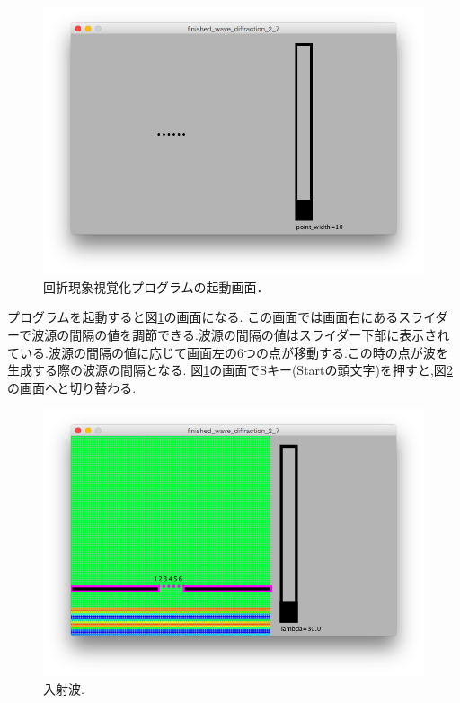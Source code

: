 \begin{figure}[htbp]
 \begin{center}
  \includegraphics[width=\linewidth]{../result/diffractionstart.png}
 \end{center}
 \caption{回折現象視覚化プログラムの起動画面．}
 \label{fig:start}
\end{figure}



プログラムを起動すると図\ref{fig:start}の画面になる.
この画面では画面右にあるスライダーで波源の間隔の値を調節できる.波源の間隔の値はスライダー下部に表示されている.波源の間隔の値に応じて画面左の6つの点が移動する.この時の点が波を生成する際の波源の間隔となる.
図\ref{fig:start}の画面でSキー(Startの頭文字)を押すと,図\ref{fig:incident}の画面へと切り替わる.
\begin{figure}[htbp]
 \begin{center}
  \includegraphics[width=130mm]{../result/diffractionincident.png}
 \end{center}
 \caption{入射波.}
 \label{fig:incident}
\end{figure}


